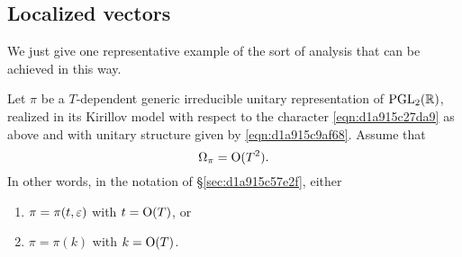 \documentclass[reqno]{amsart} 
\numberwithin{equation}{section}
\begin{document}
\subsection{Localized vectors}\label{sec:d1a9162d5b8b}
We just give one representative example of the sort of analysis that can be achieved in this way.

\begin{exercise}\label{exercise:d1a9162d527e}
  Let $\pi$ be a $T$-dependent generic irreducible unitary representation of $\operatorname{PGL}_2(\mathbb{R})$, realized in its Kirillov model with respect to the character \eqref{eqn:d1a915c27da9} as above and with unitary structure given by \eqref{eqn:d1a915c9af68}.  Assume that
  \begin{equation*}
    \Omega_\pi = \operatorname{O}(T^2).
  \end{equation*}
  In other words, in the notation of \S\ref{sec:d1a915c57e2f}, either
  \begin{enumerate}
  \item $\pi = \pi(t,\varepsilon)$ with $t = \operatorname{O}(T)$, or
  \item $\pi = \pi(k)$ with $k = \operatorname{O}(T)$.
  \end{enumerate}


\end{exercise}
\end{document}
